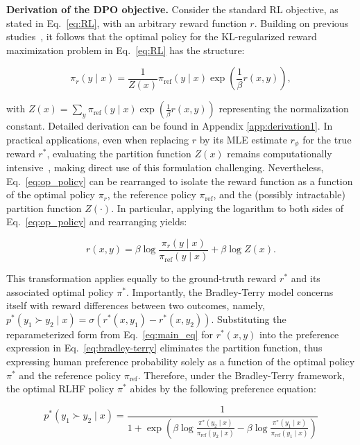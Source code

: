 \textbf{Derivation of the DPO objective.} Consider the standard RL objective, as stated in Eq.~\ref{eq:RL}, with an arbitrary reward function $r$. Building on previous studies~\citep{peters2007reinforcement, peng2019advantage, korbak2022reinforcement, go2023aligning}, it follows that the optimal policy for the KL-regularized reward maximization problem in Eq.~\ref{eq:RL} has the structure:

\begin{equation}\label{eq:op_policy}
    \pi_r(y\mid x) = \frac{1}{Z(x)}\pi_\text{ref}(y\mid x)\exp\left(\frac{1}{\beta}r(x, y)\right),
\end{equation}

with $Z(x) =\sum_{y}\pi_\text{ref}(y\mid x)\exp\left(\frac{1}{\beta}r(x, y)\right)$ representing the normalization constant. Detailed derivation can be found in Appendix \ref{app:derivation1}. In practical applications, even when replacing $r$ by its MLE estimate $r_{\phi}$ for the true reward $r^*$, evaluating the partition function $Z(x)$ remains computationally intensive~\citep{korbak2022reinforcement, go2023aligning}, making direct use of this formulation challenging. Nevertheless, Eq.~\ref{eq:op_policy} can be rearranged to isolate the reward function as a function of the optimal policy $\pi_r$, the reference policy $\pi_\text{ref}$, and the (possibly intractable) partition function $Z(\cdot)$. In particular, applying the logarithm to both sides of Eq.~\ref{eq:op_policy} and rearranging yields:

\begin{equation}\label{eq:main_eq}
    r(x,y) =\beta \log \frac{\pi_r(y\mid x)}{\pi_\text{ref}(y\mid x)} + \beta \log Z(x).
\end{equation}

This transformation applies equally to the ground-truth reward $r^*$ and its associated optimal policy $\pi^*$. Importantly, the Bradley-Terry model concerns itself with reward differences between two outcomes, namely, ${p^*(y_1 \succ y_2 \mid x) = \sigma(r^*(x, y_1) - r^*(x, y_2))}$. Substituting the reparameterized form from Eq.~\ref{eq:main_eq} for $r^*(x, y)$ into the preference expression in Eq.~\ref{eq:bradley-terry} eliminates the partition function, thus expressing human preference probability solely as a function of the optimal policy $\pi^*$ and the reference policy $\pi_\text{ref}$. Therefore, under the Bradley-Terry framework, the optimal RLHF policy $\pi^*$ abides by the following preference equation:

\begin{equation}\label{eq:objective}
    p^*(y_1\succ y_2 \mid x)=\frac{1}{1 + \exp\left(\beta \log \frac{\pi^*(y_2\mid x)}{\pi_\text{ref}(y_2\mid x)} - \beta \log \frac{\pi^*(y_1\mid x)}{\pi_\text{ref}(y_1\mid x)}\right)}
\end{equation}

